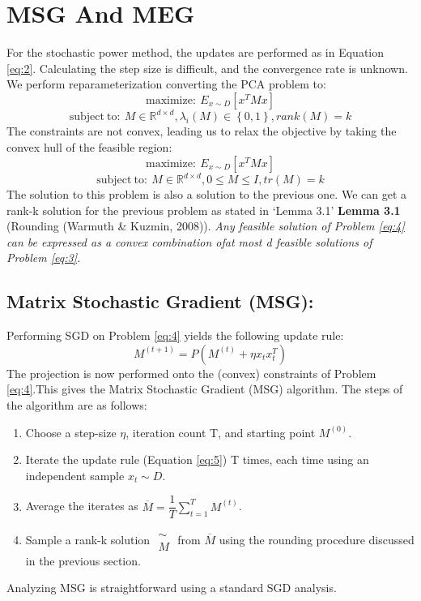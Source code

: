 \documentclass{article}
\begin{document}
\section{MSG And MEG}
For the stochastic power method, the updates are performed as in Equation \ref{eq:2}. Calculating the step size is difficult, and the convergence rate is unknown. We perform reparameterization converting the PCA problem to:
\begin{equation}\label{eq:3} 
\mathrm{maximize :\ }E_{x\sim D}\left[ x^{T}Mx\right]
\end{equation}
\begin{equation}
\mathrm{subject\ to :\ }M\in \mathbb{R} ^{d\times d},\lambda _{i}\left( M\right) \in \left\{ 0,1\right\} ,rank\left( M\right) =k
\end{equation}
The constraints are not convex, leading us to relax the objective by taking the convex hull of the feasible region:
\begin{equation}\label{eq:4} 
\mathrm{maximize :\ }E_{x\sim D}\left[ x^{T}Mx\right]
\end{equation}
\begin{equation}
\mathrm{subject\ to :\ }M\in \mathbb{R} ^{d\times d},0\leq M\leq I,tr\left( M\right) =k
\end{equation}
The solution to this problem is also a solution to the previous one. We can get a rank-k solution for the previous problem as stated in ‘Lemma 3.1’
\textbf{Lemma 3.1} (Rounding (Warmuth \& Kuzmin, 2008)). \textit{Any feasible solution of Problem \ref{eq:4} can be expressed as a convex combination ofat most d feasible solutions of Problem \ref{eq:3}.}
\subsection{Matrix Stochastic Gradient (MSG):}
Performing SGD on Problem \ref{eq:4} yields the following update rule:
\begin{equation}\label{eq:5}
    M^{\left( t+1\right) }=P\left( M^{\left( t\right) }+\eta x_{t}x^{T}_{t}\right) 
\end{equation}
The projection is now performed onto the (convex) constraints of Problem \ref{eq:4}.This gives the Matrix Stochastic Gradient (MSG) algorithm. The steps of the algorithm are as follows:
\begin{enumerate}
    \item Choose a step-size $\eta$, iteration count T, and starting point $M^{(0)}$.
    \item Iterate the update rule (Equation \ref{eq:5}) T times, each time using an independent sample $x_{t}\sim D$.
    \item Average the iterates as $\overline {M}=\dfrac {1}{T}\sum ^{T}_{t=1}M^{\left( t\right) }$.
    \item Sample a rank-k solution $\begin{aligned}\sim \\
M\end{aligned}$ from $\overline {M}$ using the rounding procedure discussed in the previous section.
\end{enumerate}
Analyzing MSG is straightforward using a standard SGD analysis.
\end{document}
